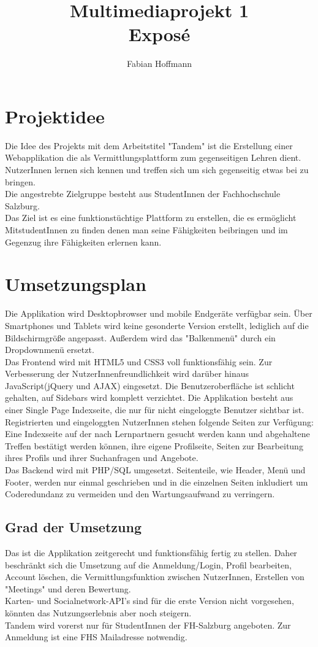 \documentclass{article} %
\author{Fabian Hoffmann}
\title{
Multimediaprojekt 1 \\Exposé}
\begin{document}
\maketitle
\newpage
\section{Projektidee}
Die Idee des Projekts mit dem Arbeitstitel "Tandem" ist die Erstellung einer Webapplikation die als Vermittlungsplattform zum gegenseitigen Lehren dient. NutzerInnen lernen sich kennen und treffen sich um sich gegenseitig etwas bei zu bringen. \\Die angestrebte Zielgruppe besteht aus StudentInnen der Fachhochschule Salzburg.
\\Das Ziel ist es eine funktionstüchtige Plattform zu erstellen, die es ermöglicht MitstudentInnen zu finden denen man seine Fähigkeiten beibringen und im Gegenzug ihre Fähigkeiten erlernen kann.


\section{Umsetzungsplan}
Die Applikation wird Desktopbrowser und mobile Endgeräte verfügbar sein. Über Smartphones und Tablets wird keine gesonderte Version erstellt, lediglich auf die Bildschirmgröße angepasst. Außerdem wird das "Balkenmenü" durch ein Dropdownmenü ersetzt.\\
Das Frontend wird mit HTML5 und CSS3 voll funktionsfähig sein. Zur Verbesserung der NutzerInnenfreundlichkeit wird darüber hinaus JavaScript(jQuery und AJAX) eingesetzt. Die Benutzeroberfläche ist schlicht gehalten, auf Sidebars wird komplett verzichtet. Die Applikation besteht aus einer Single Page Indexseite, die nur für nicht eingeloggte Benutzer sichtbar ist.
Registrierten und eingeloggten NutzerInnen stehen folgende Seiten zur Verfügung: Eine Indexseite auf der nach Lernpartnern gesucht werden kann und abgehaltene Treffen bestätigt werden können, ihre eigene Profilseite, Seiten zur Bearbeitung ihres Profils und ihrer Suchanfragen und Angebote.\\
Das Backend wird mit PHP/SQL umgesetzt. Seitenteile, wie Header, Menü und Footer, werden nur einmal geschrieben und in die einzelnen Seiten inkludiert um Coderedundanz zu vermeiden und den Wartungsaufwand zu verringern.
\subsection{Grad der Umsetzung}
Das ist die Applikation zeitgerecht und funktionsfähig fertig zu stellen. Daher beschränkt sich die Umsetzung auf die Anmeldung/Login, Profil bearbeiten, Account löschen, die Vermittlungsfunktion zwischen NutzerInnen, Erstellen von "Meetings" und deren Bewertung. \\
Karten- und Socialnetwork-API's sind für die erste Version nicht vorgesehen, könnten das Nutzungserlebnis aber noch steigern. \\
Tandem wird vorerst nur für StudentInnen der FH-Salzburg angeboten. Zur Anmeldung ist eine FHS Mailadresse notwendig. 
\end{document}
